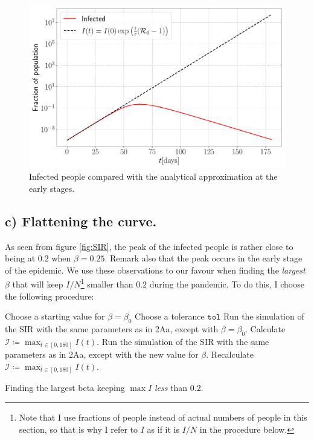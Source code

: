 \begin{figure}[htb]
	\centering
	\includegraphics[width=0.8\columnwidth]{../fig/2Ab_I.pdf}
	\caption{Infected people compared with the analytical approximation at the early stages.}
	\label{fig:Infected}
\end{figure}

\subsection{c) Flattening the curve. }

As seen from figure \ref{fig:SIR}, the peak of the infected people is rather close to being at $0.2$ when $\beta = 0.25$. Remark also that the peak occurs in the early stage of the epidemic. We use these observations to our favour when finding the \textit{largest} $\beta$ that will keep $I/N$\footnote{Note that I use fractions of people instead of actual numbers of people in this section, so that is why I refer to $I$ as if it is $I/N$ in the procedure below.} smaller than $0.2$ during the pandemic. To do this, I choose the following procedure:

\begin{algorithm}[H]
	Choose a starting value for $\beta = \beta_0$\;
	Choose a tolerance $\texttt{tol}$\;
	Run the simulation of the SIR with the same parameters as in 2Aa, except with $\beta = \beta_0$.\;
	Calculate $\mathcal{I} \coloneqq \max_{t\in[0,180]} I(t)$.\;
		Run the simulation of the SIR with the same parameters as in 2Aa, except with the new value for $\beta$.\;
		Recalculate $\mathcal{I} \coloneqq \max_{t\in[0,180]} I(t)$.\;
	\caption{Finding the largest beta keeping $\max I$ \textit{less} than 0.2.}
\end{algorithm} 

